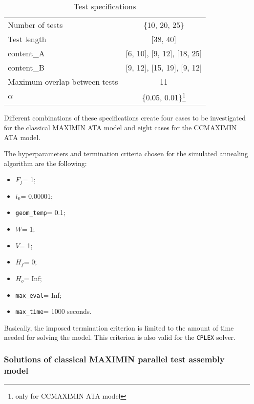 \begin{table}[htbp]\label{tab:specATA}
	\centering
	\caption{Test specifications}
	\renewcommand{\arraystretch}{1.3}
	\begin{tabular}{ l  c }
		\toprule
		Number of tests & \{10, 20, 25\} \\
		Test length   & [38, 40] \\
		content\_A   & [6, 10], [9, 12], [18, 25]\footnotemark  \\
		content\_B  & [9, 12], [15, 19], [9, 12] \\
		Maximum overlap between tests  & 11 \\
		$\alpha$ & \{0.05, 0.01\}\footnote{only for CCMAXIMIN ATA model}\\
		\bottomrule
	\end{tabular}
\end{table}
Different combinations of these specifications create four cases to be investigated for the classical MAXIMIN ATA model and eight cases for the CCMAXIMIN ATA model.

The hyperparameters and \hypertarget{tc}{termination criteria} chosen for the simulated annealing algorithm are the following:
\begin{itemize}
	\item $F_f$= 1;
	\item $t_0$= 0.00001;
	\item \texttt{geom\_temp}= 0.1;
	\item $W$= 1;
	\item $V$= 1;
	\item $H_f$= 0;
	\item $H_o$= Inf;
	\item \texttt{max\_eval}= Inf;
	\item \texttt{max\_time}= 1000 seconds.
\end{itemize}
Basically, the imposed termination criterion is limited to the amount of time needed for solving the model. This criterion is also valid for the \texttt{CPLEX} solver.

\subsubsection{Solutions of classical MAXIMIN parallel test assembly model} \label{sec:mmsol}


